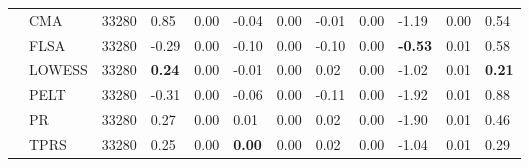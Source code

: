 \begin{table}[ht]
\begin{tabular}{llrlrlrlrlrl}
   & CMA & 33280 & 0.85 & 0.00 & -0.04 & 0.00 & -0.01 & 0.00 & -1.19 & 0.00 & 0.54 \\ 
   & FLSA & 33280 & -0.29 & 0.00 & -0.10 & 0.00 & -0.10 & 0.00 & \textbf{-0.53} & 0.01 & 0.58 \\ 
   & LOWESS & 33280 & \textbf{0.24} & 0.00 & -0.01 & 0.00 & 0.02 & 0.00 & -1.02 & 0.01 & \textbf{0.21} \\ 
   & PELT & 33280 & -0.31 & 0.00 & -0.06 & 0.00 & -0.11 & 0.00 & -1.92 & 0.01 & 0.88 \\ 
   & PR & 33280 & 0.27 & 0.00 & 0.01 & 0.00 & 0.02 & 0.00 & -1.90 & 0.01 & 0.46 \\ 
   & TPRS & 33280 & 0.25 & 0.00 & \textbf{0.00} & 0.00 & 0.02 & 0.00 & -1.04 & 0.01 & 0.29 \\ 
   \bottomrule
\end{tabular}
\end{table}
